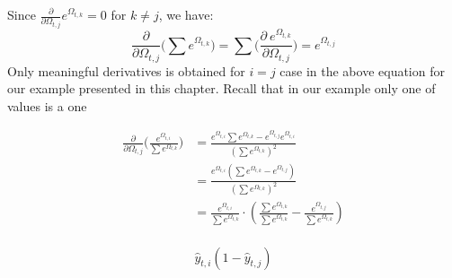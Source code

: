 \documentclass{article}
\begin{document}

Since $\frac{\partial }{\partial \Omega_{t,j}}e^{\Omega_{t,k}}=0$ for $k \neq j$, we have:
$$
\frac{\partial}{\partial \Omega_{t,j}}\bigg( \sum e^{\Omega_{t,k}} \bigg) =\sum \bigg( \frac{\partial ~e^{\Omega_{t,k}}}{\partial \Omega_{t,j}} \bigg) =e^{\Omega_{t,j}}
$$
Only meaningful derivatives is obtained for $i=j$  case in the above equation for our example presented in this chapter. Recall that in our example only one of  values is a one




\begin{align*}
\frac{\partial }{\partial \Omega_{t,j}} \bigg( \frac{e^{\Omega_{t,i}}}{\sum e^{\Omega_{t,k}}} \bigg) &=\frac{e^{\Omega_{t,i}} \sum e^{\Omega_{t,k}}-e^{\Omega_{t,j}} e^{\Omega_{t,i}}}{\left(\sum e^{\Omega_{t,k}}\right)^{2}} \\
& =\frac{e^{\Omega_{t,i}}\left(\sum e^{\Omega_{t,k}}-e^{\Omega_{t,j}}\right)}{\left(\sum e^{\Omega_{t,k}}\right)^{2}} \\
& =\frac{e^{\Omega_{t,i}}}{\sum e^{\Omega_{t,k}}} \cdot\left(\frac{\sum e^{\Omega_{t,k}}}{\sum e^{\Omega_{t,k}}}-\frac{e^{\Omega_{t,j}}}{\sum e^{\Omega_{t,k}}}\right) \\
\end{align*}

\begin{equation}
\label{eqn:partial_softmax}
    \hat{y}_{t,i}\left(1-\hat{y}_{t,j}\right)
\end{equation}
\end{document}
